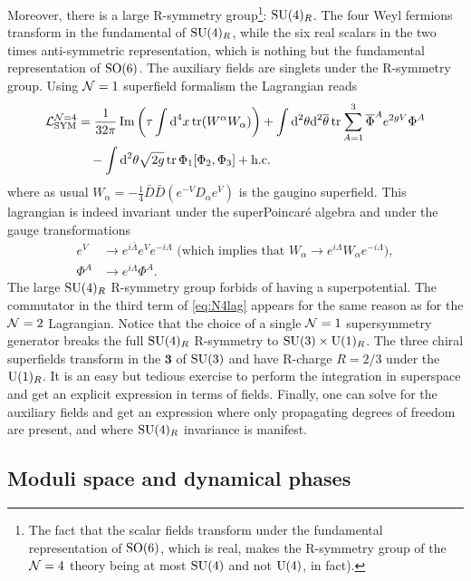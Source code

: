         Moreover, there is a large R-symmetry group\footnote{The fact that the scalar fields transform under the fundamental representation of $\text{SO}(6)$, which is real, makes the R-symmetry group of the $\mathcal{N} = 4$ theory being at most $\text{SU}(4)$ and not $\text{U}(4)$, in fact).}: $\text{SU}(4)_R$. The four Weyl fermions transform in the fundamental of $\text{SU}(4)_R$, while the six real scalars in the two times anti-symmetric representation, which is nothing but the fundamental representation of $\text{SO}(6)$. The auxiliary fields are singlets under the R-symmetry group. Using $\mathcal{N} = 1$ superfield formalism the Lagrangian reads
        \begin{align}
            \begin{split}
                \mathcal{L}^{\mathcal{N}=4}_{\text{SYM}} &= \frac{1}{32\pi}\Im \left(\tau\int\text{d}^4x\tr(W^\alpha W_\alpha)\right)+\int\text{d}^2\theta\text{d}^2\overline{\theta}\tr\sum^3_{A=1}\overline{\Phi}^Ae^{2gV}\Phi^A\\
                &\quad-\int\text{d}^2\theta\sqrt{2g}\tr\Phi_1[\Phi_2,\Phi_3]+\text{h.c.}
            \end{split}\label{eq:N4lag}
        \end{align}
        where as usual $W_\alpha=-\frac{1}{4}\bar{D}\bar{D}(e^{-V}D_\alpha e^V)$ is the gaugino superfield. This lagrangian is indeed invariant under the superPoincaré algebra and under the gauge transformations
        \begin{align}
            e^V &\to e^{i\bar{\Lambda}} e^V e^{-i\Lambda} \text{ (which implies that $W_\alpha \to e^{i\Lambda}W_\alpha e^{-i\Lambda}$)},\\
            \Phi^A &\to e^{i\Lambda}\Phi^A.
        \end{align}
        The large $\text{SU}(4)_R$ R-symmetry group forbids of having a superpotential. The commutator in the third term of \eqref{eq:N4lag} appears for the same reason as for the $\mathcal{N} = 2$ Lagrangian. Notice that the choice of a single $\mathcal{N} = 1$ supersymmetry generator breaks the full $\text{SU}(4)_R$ R-symmetry to $\text{SU}(3)\times \text{U}(1)_R$. The three chiral superfields transform in the $\boldsymbol{3}$ of $\text{SU}(3)$ and have R-charge $R = 2/3$ under the $\text{U}(1)_R$. It is an easy but tedious exercise to perform the integration in superspace and get an explicit expression in terms of fields. Finally, one can solve for the auxiliary fields and get an expression where only propagating degrees of freedom are present, and where $\text{SU}(4)_R$ invariance is manifest.

    \subsection{Moduli space and dynamical phases}

